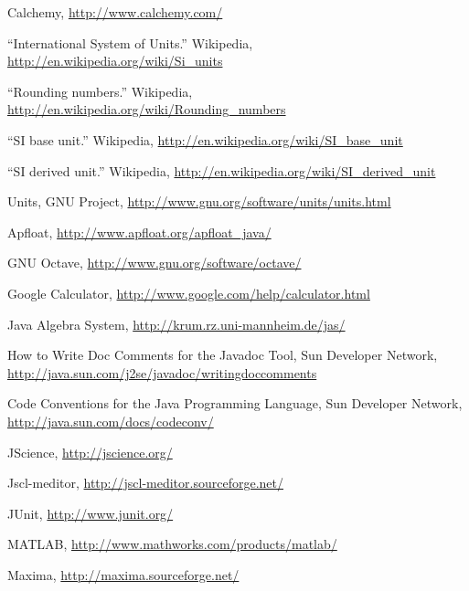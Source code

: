 \begin{thebibliography}{99}

 Calchemy, \url{http://www.calchemy.com/}

 ``International System of Units.''  Wikipedia,
  \url{http://en.wikipedia.org/wiki/Si_units}

 ``Rounding numbers.''  Wikipedia,
  \url{http://en.wikipedia.org/wiki/Rounding_numbers}

 ``SI base unit.''  Wikipedia,
  \url{http://en.wikipedia.org/wiki/SI_base_unit}

 ``SI derived unit.''  Wikipedia,
  \url{http://en.wikipedia.org/wiki/SI_derived_unit}

 Units, GNU Project,
  \url{http://www.gnu.org/software/units/units.html}

 Apfloat, \url{http://www.apfloat.org/apfloat_java/}

 GNU Octave, \url{http://www.gnu.org/software/octave/}

 Google Calculator, \url{http://www.google.com/help/calculator.html}

 Java Algebra System, \url{http://krum.rz.uni-mannheim.de/jas/}

 How to Write Doc Comments for the Javadoc Tool, Sun
  Developer Network,
  \url{http://java.sun.com/j2se/javadoc/writingdoccomments}

 Code Conventions for the Java Programming
Language, Sun Developer Network, \url{http://java.sun.com/docs/codeconv/}

 JScience,  \url{http://jscience.org/}

 Jscl-meditor, \url{http://jscl-meditor.sourceforge.net/}

 JUnit, \url{http://www.junit.org/}

 MATLAB, \url{http://www.mathworks.com/products/matlab/}

 Maxima, \url{http://maxima.sourceforge.net/}

\end{thebibliography}
